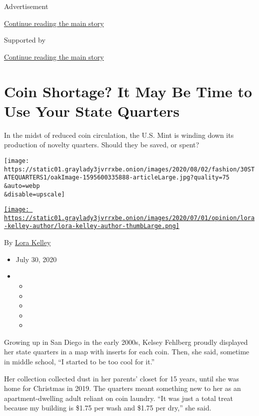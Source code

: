 Advertisement

\protect\hyperlink{after-top}{Continue reading the main story}

Supported by

\protect\hyperlink{after-sponsor}{Continue reading the main story}

\hypertarget{coin-shortage-it-may-be-time-to-use-your-state-quarters}{%
\section{Coin Shortage? It May Be Time to Use Your State
Quarters}\label{coin-shortage-it-may-be-time-to-use-your-state-quarters}}

In the midst of reduced coin circulation, the U.S. Mint is winding down
its production of novelty quarters. Should they be saved, or spent?

\texttt{[image: https://static01.graylady3jvrrxbe.onion/images/2020/08/02/fashion/30STATEQUARTERS1/oakImage-1595600335888-articleLarge.jpg?quality=75\\\&auto=webp\\\&disable=upscale]}

\href{https://www.nytimes3xbfgragh.onion/by/lora-kelley}{\texttt{[image: https://static01.graylady3jvrrxbe.onion/images/2020/07/01/opinion/lora-kelley-author/lora-kelley-author-thumbLarge.png]}}

By \href{https://www.nytimes3xbfgragh.onion/by/lora-kelley}{Lora Kelley}

\begin{itemize}
\item
  July 30, 2020
\item
  \begin{itemize}
  \item
  \item
  \item
  \item
  \item
  \end{itemize}
\end{itemize}

Growing up in San Diego in the early 2000s, Kelsey Fehlberg proudly
displayed her state quarters in a map with inserts for each coin. Then,
she said, sometime in middle school, ``I started to be too cool for
it.''

Her collection collected dust in her parents' closet for 15 years, until
she was home for Christmas in 2019. The quarters meant something new to
her as an apartment-dwelling adult reliant on coin laundry. ``It was
just a total treat because my building is \$1.75 per wash and \$1.75 per
dry,'' she said.

